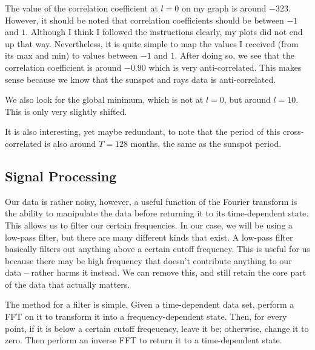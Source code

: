 \documentclass[12pt]{article}
\begin{document}
The value of the correlation coefficient at $l=0$ on my graph is around $-323$. However, it should be noted that correlation coefficients should be between $-1$ and $1$. Although I think I followed the instructions clearly, my plots did not end up that way. Nevertheless, it is quite simple to map the values I received (from its max and min) to values between $-1$ and $1$. After doing so, we see that the correlation coefficient is around $-0.90$ which is very anti-correlated. This makes sense because we know that the sunspot and rays data is anti-correlated.

We also look for the global minimum, which is not at $l=0$, but around $l=10$. This is only very slightly shifted.


It is also interesting, yet maybe redundant, to note that the period of this cross-correlated is also around $T=128$ months, the same as the sunspot period. 



\subsection*{Signal Processing}


Our data is rather noisy, however, a useful function of the Fourier transform is the ability to manipulate the data before returning it to its time-dependent state. This allows us to filter our certain frequencies. In our case, we will be using a low-pass filter, but there are many different kinds that exist. A low-pass filter basically filters out anything above a certain cutoff frequency. This is useful for us because there may be high frequency that doesn't contribute anything to our data -- rather harms it instead. We can remove this, and still retain the core part of the data that actually matters.

The method for a filter is simple. Given a time-dependent data set, perform a FFT on it to transform it into a frequency-dependent state. Then, for every point, if it is below a certain cutoff freqeuency, leave it be; otherwise, change it to zero. Then perform an inverse FFT to return it to a time-dependent state.
\end{document}
